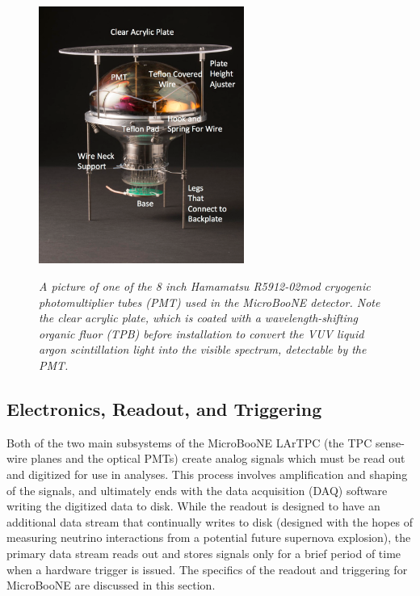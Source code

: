 \begin{figure}[ht!]
\centering
	\includegraphics[width=0.6\textwidth]{Figures/mount_PMT_labeled.png} \\
\caption{\textit{A picture of one of the 8 inch Hamamatsu R5912-02mod cryogenic photomultiplier tubes (PMT) used in the MicroBooNE detector. Note the clear acrylic plate, which is coated with a wavelength-shifting organic fluor (TPB) before installation to convert the VUV liquid argon scintillation light into the visible spectrum, detectable by the PMT.}}\label{pmt_mount_fig}
\end{figure}


\subsection{Electronics, Readout, and Triggering}
Both of the two main subsystems of the MicroBooNE LArTPC (the TPC sense-wire planes and the optical PMTs) create analog signals which must be read out and digitized for use in analyses. This process involves amplification and shaping of the signals, and ultimately ends with the data acquisition (DAQ) software writing the digitized data to disk. While the readout is designed to have an additional data stream that continually writes to disk (designed with the hopes of measuring neutrino interactions from a potential future supernova explosion), the primary data stream reads out and stores signals only for a brief period of time when a hardware trigger is issued. The specifics of the readout and triggering for MicroBooNE are discussed in this section.\\

